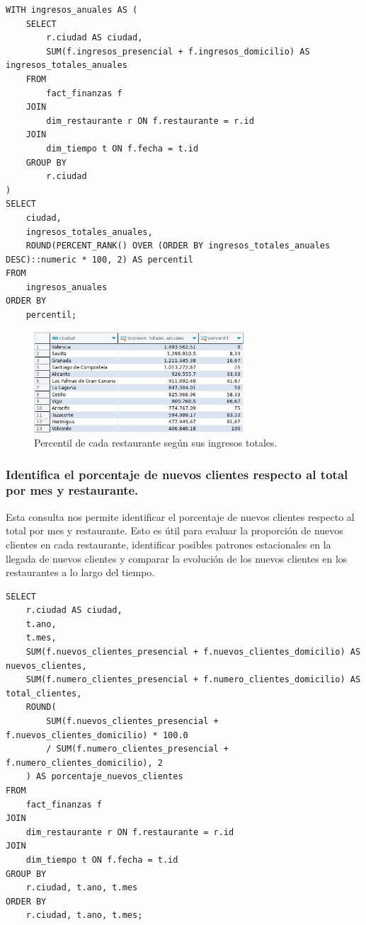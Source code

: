 \documentclass[11pt]{opticajnl}
\begin{document}
\begin{lstlisting}[style=terminal]
WITH ingresos_anuales AS (
    SELECT 
        r.ciudad AS ciudad,
        SUM(f.ingresos_presencial + f.ingresos_domicilio) AS ingresos_totales_anuales
    FROM 
        fact_finanzas f
    JOIN 
        dim_restaurante r ON f.restaurante = r.id
    JOIN 
        dim_tiempo t ON f.fecha = t.id
    GROUP BY 
        r.ciudad
)
SELECT 
    ciudad,
    ingresos_totales_anuales,
    ROUND(PERCENT_RANK() OVER (ORDER BY ingresos_totales_anuales DESC)::numeric * 100, 2) AS percentil
FROM 
    ingresos_anuales
ORDER BY 
    percentil;
\end{lstlisting}

\begin{figure}[H]
    \centering
    \includegraphics[width=0.7\textwidth]{fotos/q5.jpg}
    \caption{Percentil de cada restaurante según sus ingresos totales.}
    \label{fig:rolap4}
\end{figure}

\subsubsection{Identifica el porcentaje de nuevos clientes respecto al total por mes y restaurante.}

Esta consulta nos permite identificar el porcentaje de nuevos clientes respecto al total por mes y restaurante. Esto es útil para evaluar la proporción de nuevos clientes en cada restaurante, identificar posibles patrones estacionales en la llegada de nuevos clientes y comparar la evolución de los nuevos clientes en los restaurantes a lo largo del tiempo.

\begin{lstlisting}[style=terminal]
SELECT 
    r.ciudad AS ciudad,
    t.ano,
    t.mes,
    SUM(f.nuevos_clientes_presencial + f.nuevos_clientes_domicilio) AS nuevos_clientes,
    SUM(f.numero_clientes_presencial + f.numero_clientes_domicilio) AS total_clientes,
    ROUND(
        SUM(f.nuevos_clientes_presencial + f.nuevos_clientes_domicilio) * 100.0 
        / SUM(f.numero_clientes_presencial + f.numero_clientes_domicilio), 2
    ) AS porcentaje_nuevos_clientes
FROM 
    fact_finanzas f
JOIN 
    dim_restaurante r ON f.restaurante = r.id
JOIN 
    dim_tiempo t ON f.fecha = t.id
GROUP BY 
    r.ciudad, t.ano, t.mes
ORDER BY 
    r.ciudad, t.ano, t.mes;
\end{lstlisting}
\end{document}
